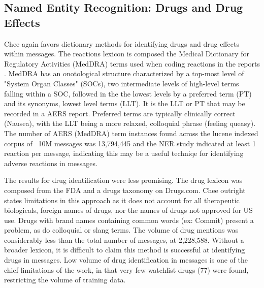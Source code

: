 \documentclass[twoside,11pt]{article}
\begin{document}
\subsection{Named Entity Recognition: Drugs and Drug Effects}
Chee again favors dictionary methods for identifying drugs and drug effects within messages. The reactions lexicon is composed the Medical Dictionary for Regulatory Activities (MedDRA) terms used when coding reactions in the reports \citep{FAERS}. MedDRA has an onotological structure characterized by a top-most level of "System Organ Classes" (SOCs), two intermediate levels of high-level terms falling within a SOC, followed in the the lowest levels by a preferred term (PT) and its synonyms, lowest level terms (LLT). It is the LLT or PT that may be recorded in a AERS report. Preferred terms are typically clinically correct (Nausea), with the LLT being a more relaxed, colloquial phrase (feeling queasy). The number of AERS (MedDRA) term instances found across the lucene indexed corpus of ~10M messages was 13,794,445 and the NER study indicated at least 1 reaction per message, indicating this may be a useful techniqe for identifying adverse reactions in messages.
\par The results for drug identification were less promising.  The drug lexicon was composed from the FDA and a drugs taxonomy on Drugs.com. Chee outright states limitations in this approach as it does not account for all therapeutic biologicals, foreign names of drugs, nor the names of drugs not approved for US use. Drugs with brand names containing common words (ex: Commit) present a problem, as do colloquial or slang terms. The volume of drug mentions was considerably less than the total number of messages, at 2,228,588. Without a broader lexicon, it is difficult to claim this method is successful at identifying drugs in messages. Low volume of drug identification in messages is one of the chief limitations of the work, in that very few watchlist drugs (77) were found, restricting the volume of training data.
\end{document}
